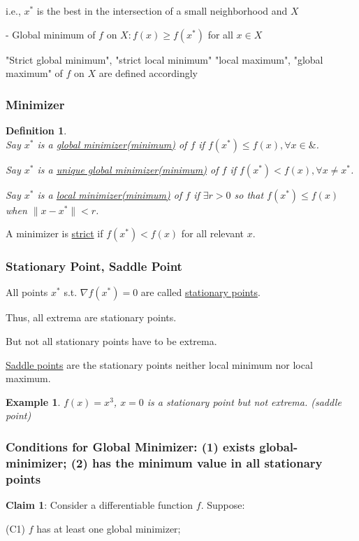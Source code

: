 \documentclass[11pt,a4paper]{article}
\newtheorem{example}{Example}
\newtheorem{definition}{Definition}
\begin{document}
i.e., $x^{*}$ is the best in the intersection of a small neighborhood and $X$

- Global minimum of $f$ on $X: f(x) \geq f\left(x^{*}\right)$ for all $x \in X$

"Strict global minimum", "strict local minimum" "local maximum", "global maximum" of $f$ on $X$ are defined accordingly

\subsubsection{Minimizer}
\begin{definition}
    \quad\\
    Say $x^*$ is a \underline{global minimizer(minimum)} of $f$ if $f(x^*)\leq f(x), \forall x\in \&$.

    Say $x^*$ is a \underline{unique global minimizer(minimum)} of $f$ if $f(x^*)< f(x), \forall x\neq x^*$.

    Say $x^*$ is a \underline{local minimizer(minimum)} of $f$ if $\exists r>0$ so that $f(x^*)\leq f(x)$ when $\|x-x^*\|<r$.
\end{definition}

A minimizer is \underline{strict} if $f(x^*)< f(x)$ for all relevant $x$.

\subsubsection{Stationary Point, Saddle Point}
All points $x^*$ s.t. $\nabla f(x^*)=0$ are called \underline{stationary points}.

Thus, all extrema are stationary points.

But not all stationary points have to be extrema.

\underline{Saddle points} are the stationary points neither local minimum nor local maximum.

\begin{example}
$f(x)=x^3$, $x=0$ is a stationary point but not extrema. (saddle point)
\end{example}

\subsubsection{ Conditions for Global Minimizer: (1) exists global-minimizer; (2) has the minimum value in all stationary points}
\textbf{Claim 1}: Consider a differentiable function $f$. Suppose:

(C1) $f$ has at least one global minimizer;
\end{document}
